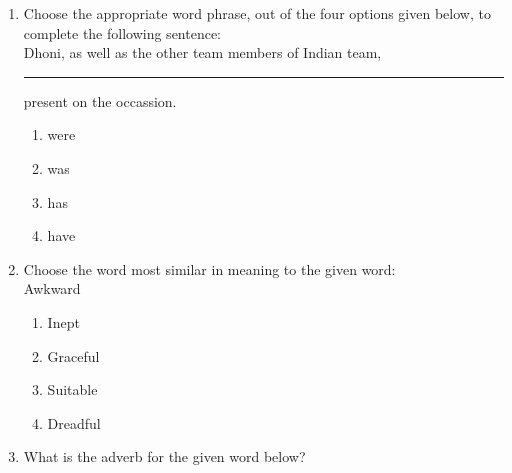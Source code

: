 \documentclass[journal]{IEEEtran}
\begin{document}
\begin{enumerate}
    

 
    \item  Choose the appropriate word phrase, out of the four options given below, to complete the following sentence:\\
    Dhoni, as well as the other team members of Indian team,\rule{1cm}{0.15mm} present on the occassion.
    \begin{multicols}{4}
        
    
\begin{enumerate}
    \item were 
    \item was
    \item has
    \item have
\end{enumerate}
   \end{multicols}
        
  \item   Choose the word most similar in meaning to the given word:\\Awkward
  \begin{multicols}{4}
    \begin{enumerate}
        \item Inept 
        \item Graceful
        \item Suitable
        \item Dreadful
    \end{enumerate}  
  \end{multicols}

 
  
  \item What is the adverb for the given word below?


\end{enumerate}
\end{document}
